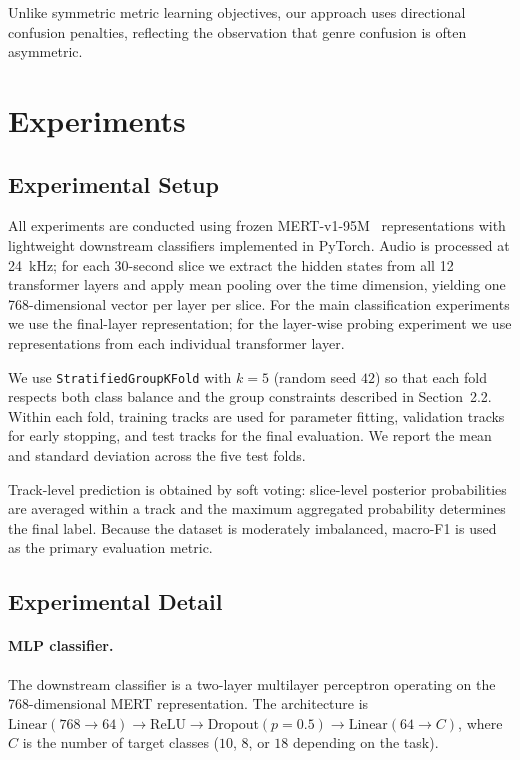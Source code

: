 \documentclass{article}
\begin{document}
Unlike symmetric metric learning objectives, our approach uses directional confusion penalties, reflecting the observation that genre confusion is often asymmetric.

\section{Experiments}

\subsection{Experimental Setup}

All experiments are conducted using frozen MERT-v1-95M~\cite{li2024mert} representations with lightweight downstream classifiers implemented in PyTorch. Audio is processed at 24~kHz; for each 30-second slice we extract the hidden states from all 12 transformer layers and apply mean pooling over the time dimension, yielding one 768-dimensional vector per layer per slice. For the main classification experiments we use the final-layer representation; for the layer-wise probing experiment we use representations from each individual transformer layer.

We use \texttt{StratifiedGroupKFold} with $k=5$ (random seed $42$) so that each fold respects both class balance and the group constraints described in Section~2.2. Within each fold, training tracks are used for parameter fitting, validation tracks for early stopping, and test tracks for the final evaluation. We report the mean and standard deviation across the five test folds.

Track-level prediction is obtained by soft voting: slice-level posterior probabilities are averaged within a track and the maximum aggregated probability determines the final label. Because the dataset is moderately imbalanced, macro-F1 is used as the primary evaluation metric.

\subsection{Experimental Detail}

\paragraph{MLP classifier.}
The downstream classifier is a two-layer multilayer perceptron operating on
the 768-dimensional MERT representation. The architecture is
$\mathrm{Linear}(768 \!\to\! 64) \to \mathrm{ReLU} \to \mathrm{Dropout}(p\!=\!0.5)
\to \mathrm{Linear}(64 \!\to\! C)$, where $C$ is the number of target classes
($10$, $8$, or $18$ depending on the task).
\end{document}
